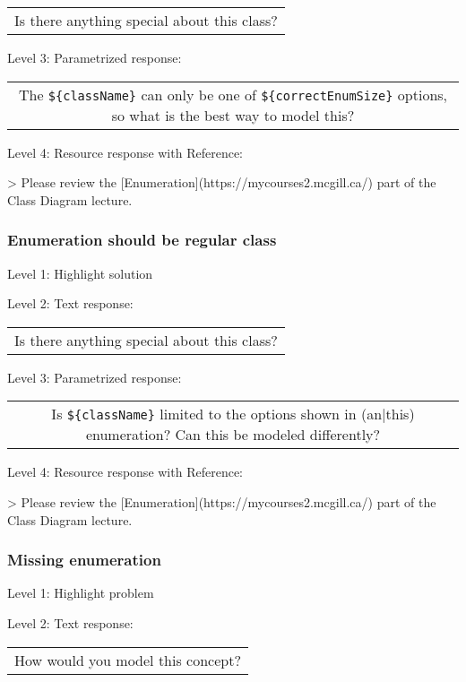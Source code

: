 \begin{tabular}{|c}
Is there anything special about this class?
\end{tabular} \medskip

\noindent Level 3: Parametrized response: \medskip

\begin{tabular}{|c}
The \verb|${className}| can only be one of \verb|${correctEnumSize}| options, so what is the best way to model this?
\end{tabular} \medskip

\noindent Level 4: Resource response with Reference:

> Please review the [Enumeration](https://mycourses2.mcgill.ca/) part of the Class Diagram lecture.


\subsubsection{Enumeration should be regular class}

\noindent Level 1: Highlight solution \medskip

\noindent Level 2: Text response: \medskip

\begin{tabular}{|c}
Is there anything special about this class?
\end{tabular} \medskip

\noindent Level 3: Parametrized response: \medskip

\begin{tabular}{|c}
Is \verb|${className}| limited to the options shown in (an|this) enumeration? Can this be modeled differently?
\end{tabular} \medskip

\noindent Level 4: Resource response with Reference:

> Please review the [Enumeration](https://mycourses2.mcgill.ca/) part of the Class Diagram lecture.


\subsubsection{Missing enumeration}

\noindent Level 1: Highlight problem \medskip

\noindent Level 2: Text response: \medskip

\begin{tabular}{|c}
How would you model this concept?
\end{tabular} \medskip

